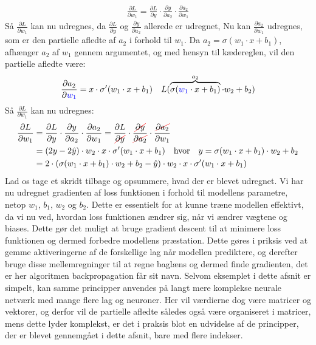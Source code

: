 \documentclass{article}
\newcommand\Ccancel[2][black]{
    \let\OldcancelColor\CancelColor
    \renewcommand\CancelColor{\color{#1}}
    \cancel{#2}
    \renewcommand\CancelColor{\OldcancelColor}
}
\begin{document}
\begin{align}
  \frac{\partial L}{\partial w_1} = \frac{\partial L}{\partial y} \cdot \frac{\partial y}{\partial a_2} \cdot \frac{\partial a_2}{\partial w_1}
\end{align}
Så $\frac{\partial L}{\partial w_1}$ kan nu udregnes, da $\frac{\partial L}{\partial y}$ og $\frac{\partial y}{\partial a_2}$ allerede er udregnet, Nu kan $\frac{\partial a_2}{\partial w_1}$ udregnes, som er den partielle afledte af $a_2$ i forhold til $w_1$. Da $a_2 = \sigma(w_1 \cdot x + b_1)$, afhænger $a_2$ af $w_1$ gennem argumentet, og med hensyn til kædereglen, vil den partielle afledte være:
\begin{align}
  \frac{\partial a_2}{\partial {\color{blue}w_1}} = x \cdot \sigma'(w_1 \cdot x + b_1) && L(\overbrace{\sigma({\color{blue}w_1} \cdot x + b_1)}^{a_2} \cdot w_2 + b_2 )
\end{align}
Så $\frac{\partial L}{\partial w_1}$ kan nu udregnes:
\begin{align}
  \frac{\partial L}{\partial w_1} &= \frac{\partial L}{\partial y} \cdot \frac{\partial y}{\partial a_2} \cdot \frac{\partial a_2}{\partial w_1} = \frac{\partial L}{\Ccancel[red]{\partial y}} \cdot \frac{\Ccancel[red]{\partial y}}{\Ccancel[red]{\partial a_2}} \cdot \frac{\Ccancel[red]{\partial a_2}}{\partial w_1}\\
  &= (2y - 2\hat{y}) \cdot w_2 \cdot x \cdot \sigma'(w_1 \cdot x + b_1) \quad\text{hvor}\quad y = \sigma(w_1 \cdot x + b_1) \cdot w_2 + b_2\\
  &= 2\cdot(\sigma(w_1 \cdot x + b_1) \cdot w_2 + b_2 - \hat{y}) \cdot w_2 \cdot x \cdot \sigma'(w_1 \cdot x + b_1)
\end{align}
Lad os tage et skridt tilbage og opsummere, hvad der er blevet udregnet. Vi har nu udregnet gradienten af loss funktionen i forhold til modellens parametre, netop $w_1$, $b_1$, $w_2$ og $b_2$. Dette er essentielt for at kunne træne modellen effektivt, da vi nu ved, hvordan loss funktionen ændrer sig, når vi ændrer vægtene og biases. Dette gør det muligt at bruge gradient descent til at minimere loss funktionen og dermed forbedre modellens præstation. Dette gøres i priksis ved at gemme aktiveringerne af de forskellige lag når modellen prediktere, og derefter bruge disse mellemregninger til at regne baglæns og dermed finde gradienten, det er her algoritmen backpropagation får sit navn. Selvom eksemplet i dette afsnit er simpelt, kan samme principper anvendes på langt mere komplekse neurale netværk med mange flere lag og neuroner. Her vil værdierne dog være matricer og vektorer, og derfor vil de partielle afledte således også være organiseret i matricer, mens dette lyder komplekst, er det i praksis blot en udvidelse af de principper, der er blevet gennemgået i dette afsnit, bare med flere indekser.\\\\
\end{document}
